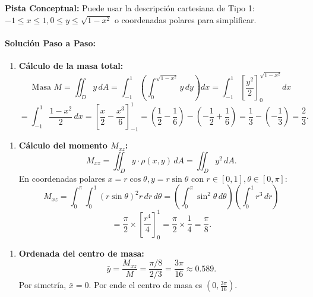 \documentclass[11pt,a4paper]{article}
\begin{document}
\begin{tcolorbox}[colback=yellow!4,colframe=accentamber!70,arc=1mm,boxrule=0.5pt,left=3mm,right=3mm,top=1.5mm,bottom=1.5mm]
\textbf{Pista Conceptual:} Puede usar la descripción cartesiana de Tipo 1: $-1 \le x \le 1, 0 \le y \le \sqrt{1-x^2}$ o coordenadas polares para simplificar.
\end{tcolorbox}

\paragraph{Solución Paso a Paso:}\par
\begin{enumerate}[label=\textbf{\arabic*.}]
\item \textbf{Cálculo de la masa total:}
\begin{equation*}
\text{Masa } M = \iint_D y \, dA = \int_{-1}^1 \left( \int_0^{\sqrt{1-x^2}} y \, dy \right) dx = \int_{-1}^1 \left[ \frac{y^2}{2} \right]_0^{\sqrt{1-x^2}} dx
\end{equation*}
\begin{equation*}
= \int_{-1}^1 \frac{1 - x^2}{2} \, dx = \left[ \frac{x}{2} - \frac{x^3}{6} \right]_{-1}^1 = \left(\frac{1}{2} - \frac{1}{6}\right) - \left(-\frac{1}{2} + \frac{1}{6}\right) = \frac{1}{3} - \left(-\frac{1}{3}\right) = \frac{2}{3}.
\end{equation*}
\end{enumerate}

\begin{enumerate}[label=\textbf{\arabic*.}]
\item \textbf{Cálculo del momento $M_{xz}$:}
\begin{equation*}
M_{xz} = \iint_D y \cdot \rho(x,y) \, dA = \iint_D y^2 \, dA.
\end{equation*}
En coordenadas polares $x = r\cos\theta, y = r\sin\theta$ con $r \in [0,1], \theta \in [0,\pi]$:
\begin{equation*}
M_{xz} = \int_0^\pi \int_0^1 (r\sin\theta)^2 r \, dr \, d\theta = \left(\int_0^\pi \sin^2\theta \, d\theta\right) \left(\int_0^1 r^3 \, dr\right)
\end{equation*}
\begin{equation*}
= \frac{\pi}{2} \times \left[\frac{r^4}{4}\right]_0^1 = \frac{\pi}{2} \times \frac{1}{4} = \frac{\pi}{8}.
\end{equation*}
\end{enumerate}

\begin{enumerate}[label=\textbf{\arabic*.}]
\item \textbf{Ordenada del centro de masa:}
\begin{equation*}
\bar{y} = \frac{M_{xz}}{M} = \frac{\pi/8}{2/3} = \frac{3\pi}{16} \approx 0.589.
\end{equation*}
Por simetría, $\bar{x} = 0$. Por ende el centro de masa es $(0, \frac{3\pi}{16})$.
\end{enumerate}
\end{document}
